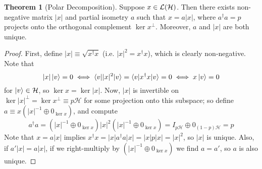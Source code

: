\documentclass[12pt,a4paper]{article}
\numberwithin{equation}{section}
\theoremstyle{definition}
\theoremstyle{theorem}
\newtheorem{theorem}{Theorem}[section]
\begin{document}
\begin{itemize}
\begin{theorem}[Polar Decomposition]
			Suppose $x\in\mathcal{L}(\mathcal{H})$. Then there exists non-negative matrix $|x|$ and partial isometry $a$ such that $x=a|x|$, where $a^{\dagger}a=p$ projects onto the orthogonal complement $\ker{x}^{\perp}$. Moreover, $a$ and $|x|$ are both unique.
		\end{theorem}
		\begin{proof}
			First, define $|x|\equiv\sqrt{x^{\dagger}x}$ (i.e. $|x|^{2}=x^{\dagger}x$), which is clearly non-negative. Note that 
			\begin{equation} 
				|x|\ket{v}=0\iff\braket{v||x|^{2}|v}=\braket{v|x^{\dagger}x|v}=0\iff x\ket{v}=0
			\end{equation}
			for $\ket{v}\in\mathcal{H}$, so $\ker{x}=\ker{|x|}$. Now, $|x|$ is invertible on $\ker{|x|}^{\perp}=\ker{x}^{\perp}\equiv p\mathcal{H}$ for some projection onto this subspace; so define $a\equiv x\left(|x|^{-1}\oplus 0_{\ker{x}}\right)$, and compute
			\begin{equation}
				a^{\dagger}a=\left(|x|^{-1}\oplus 0_{\ker{x}}\right)|x|^{2}\left(|x|^{-1}\oplus 0_{\ker{x}}\right)=I_{p\mathcal{H}}\oplus 0_{(1-p)\mathcal{H}}=p
			\end{equation}
			Note that $x=a|x|$ implies $x^{\dagger}x=|x|a^{\dagger}a|x|=|x|p|x|=|x|^{2}$, so $|x|$ is unique. Also, if $a'|x|=a|x|$, if we right-multiply by $\left(|x|^{-1}\oplus 0_{\ker{x}}\right)$ we find $a=a'$, so $a$ is also unique. 
		\end{proof}
	\end{itemize}
\end{document}
